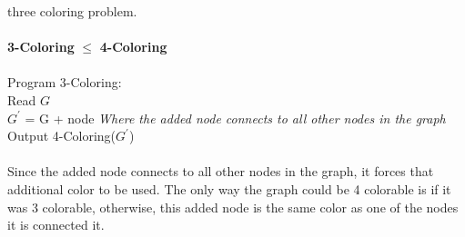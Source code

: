 \documentclass[10pt]{article}
\newcommand{\tab}{\hspace*{2em}}
\begin{document}
three coloring problem.\\
	\\
	\textbf{3-Coloring} $\leq$ \textbf{4-Coloring}\\
	\\
	Program 3-Coloring:\\
	\tab Read $G$\\
	\tab $G^\prime$ = G + node \emph{Where the added node connects to all other nodes in the graph}\\
	\tab Output 4-Coloring($G^\prime$)\\
	\\
	Since the added node connects to all other nodes in the graph, it forces that additional color to be
	used. The only way the graph could be 4 colorable is if it was 3 colorable, otherwise, this added node
	is the same color as one of the nodes it is connected it.
\end{document}

